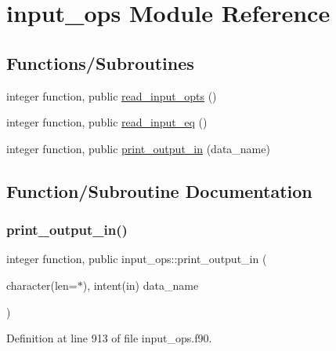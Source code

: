 \hypertarget{namespaceinput__ops}{}\section{input\+\_\+ops Module Reference}
\label{namespaceinput__ops}
\subsection*{Functions/\+Subroutines}
\begin{DoxyCompactItemize}
\item 
integer function, public \hyperlink{namespaceinput__ops_a434acca4f59f9dc1d91e04f846133684}{read\+\_\+input\+\_\+opts} ()
\item 
integer function, public \hyperlink{namespaceinput__ops_a577c897cc266961eb40bb5ef747fa077}{read\+\_\+input\+\_\+eq} ()
\item 
integer function, public \hyperlink{namespaceinput__ops_a84ec7b3833da80ebb36ae0d5ff1a9e0a}{print\+\_\+output\+\_\+in} (data\+\_\+name)
\end{DoxyCompactItemize}


\subsection{Function/\+Subroutine Documentation}
\mbox{\label{namespaceinput__ops_a84ec7b3833da80ebb36ae0d5ff1a9e0a}} 
\subsubsection{\texorpdfstring{print\+\_\+output\+\_\+in()}{print\_output\_in()}}
{\footnotesize\ttfamily integer function, public input\+\_\+ops\+::print\+\_\+output\+\_\+in (\begin{DoxyParamCaption}\item[{character(len=$\ast$), intent(in)}]{data\+\_\+name }\end{DoxyParamCaption})}



Definition at line 913 of file input\+\_\+ops.\+f90.

